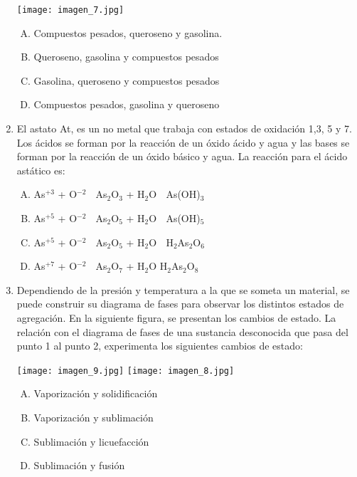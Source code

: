 \begin{enumerate}
\texttt{[image: imagen\_7.jpg]}

\begin{enumerate}[(A)]
\item Compuestos pesados, queroseno y gasolina.
\item Queroseno, gasolina y compuestos pesados
\item Gasolina, queroseno y compuestos pesados
\item Compuestos pesados, gasolina y queroseno 
\end{enumerate}

\item El astato At, es un no metal que trabaja con estados de oxidación 1,3, 5 y 7. Los ácidos se forman por la reacción de un óxido ácido y agua y las bases se forman por la reacción de un óxido básico y agua. La reacción para el ácido astático es: \label{mon-11}


\begin{enumerate}[(A)]
\item As$^{+3}$ + O$^{-2}$ $\;$ As$_2$O$_3$ + H$_2$O $\;$ As(OH)$_3$
\item As$^{+5}$ + O$^{-2}$ $\;$     As$_2$O$_5$ + H$_2$O	 $\;$  As(OH)$_5$ 
\item As$^{+5}$ + O$^{-2}$ $\;$     As$_2$O$_5$ + H$_2$O	 $\;$  H$_2$As$_2$O$_6$
\item As$^{+7}$ + O$^{-2}$ $\;$     As$_2$O$_7$ + H$_2$O	   H$_2$As$_2$O$_8$
\end{enumerate}

\item Dependiendo de la presión y temperatura a la que se someta un material, se puede construir su diagrama de fases para observar los distintos estados de agregación. En la siguiente figura, se presentan los cambios de estado. La relación con el diagrama de fases de una sustancia desconocida que pasa del punto 1 al punto 2, experimenta los siguientes cambios de estado: \label{mon-12}

\texttt{[image: imagen\_9.jpg]}
\texttt{[image: imagen\_8.jpg]}

\begin{enumerate}[(A)]
\item Vaporización y solidificación
\item Vaporización y sublimación
\item Sublimación y licuefacción
\item Sublimación y fusión
\end{enumerate}


\end{enumerate}
